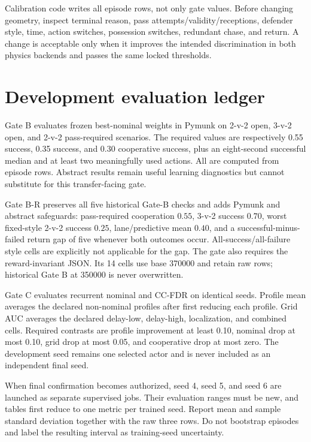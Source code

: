 \documentclass[12pt,twocolumn]{article}
\begin{document}
Calibration code writes all episode rows, not only gate values. Before changing geometry, inspect
terminal reason, pass attempts/validity/receptions, defender style, time, action switches,
possession switches, redundant chase, and return. A change is acceptable only when it improves the
intended discrimination in both physics backends and passes the same locked thresholds.

\section{Development evaluation ledger}
Gate B evaluates frozen best-nominal weights in Pymunk on 2-v-2 open, 3-v-2 open, and 2-v-2
pass-required scenarios. The required values are respectively 0.55 success, 0.35 success, and 0.30
cooperative success, plus an eight-second successful median and at least two meaningfully used
actions. All are computed from episode rows. Abstract results remain useful learning diagnostics
but cannot substitute for this transfer-facing gate.

Gate B-R preserves all five historical Gate-B checks and adds Pymunk and abstract safeguards:
pass-required cooperation \(0.55\), 3-v-2 success \(0.70\), worst fixed-style 2-v-2 success
\(0.25\), lane/predictive mean \(0.40\), and a successful-minus-failed return gap of five whenever
both outcomes occur. All-success/all-failure style cells are explicitly not applicable for the
gap. The gate also requires the reward-invariant JSON. Its 14 cells use base 370000 and retain raw
rows; historical Gate B at 350000 is never overwritten.

Gate C evaluates recurrent nominal and CC-FDR on identical seeds. Profile mean averages the
declared non-nominal profiles after first reducing each profile. Grid AUC averages the declared
delay-low, delay-high, localization, and combined cells. Required contrasts are profile improvement
at least 0.10, nominal drop at most 0.10, grid drop at most 0.05, and cooperative drop at most zero.
The development seed remains one selected actor and is never included as an independent final
seed.

When final confirmation becomes authorized, seed 4, seed 5, and seed 6 are launched as separate
supervised jobs. Their evaluation ranges must be new, and tables first reduce to one metric per
trained seed. Report mean and sample standard deviation together with the raw three rows. Do not
bootstrap episodes and label the resulting interval as training-seed uncertainty.
\end{document}
